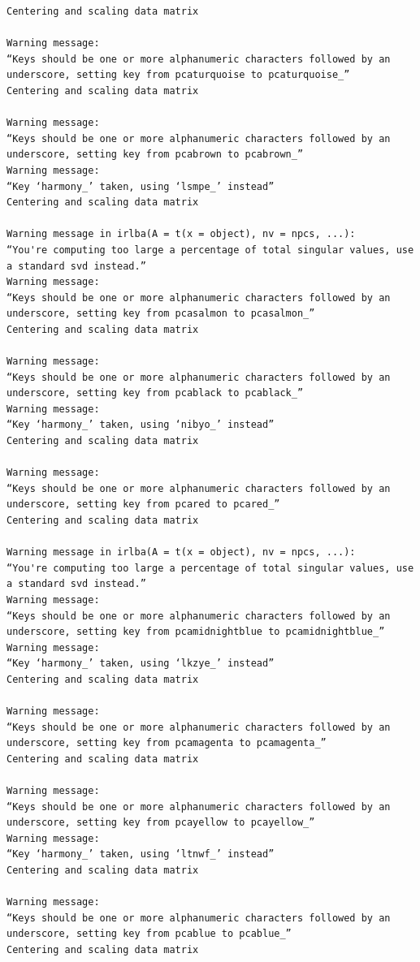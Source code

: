 \documentclass[
  letterpaper,
  DIV=11,
  numbers=noendperiod]{scrartcl}
\begin{document}
\begin{verbatim}
Centering and scaling data matrix

Warning message:
“Keys should be one or more alphanumeric characters followed by an underscore, setting key from pcaturquoise to pcaturquoise_”
Centering and scaling data matrix

Warning message:
“Keys should be one or more alphanumeric characters followed by an underscore, setting key from pcabrown to pcabrown_”
Warning message:
“Key ‘harmony_’ taken, using ‘lsmpe_’ instead”
Centering and scaling data matrix

Warning message in irlba(A = t(x = object), nv = npcs, ...):
“You're computing too large a percentage of total singular values, use a standard svd instead.”
Warning message:
“Keys should be one or more alphanumeric characters followed by an underscore, setting key from pcasalmon to pcasalmon_”
Centering and scaling data matrix

Warning message:
“Keys should be one or more alphanumeric characters followed by an underscore, setting key from pcablack to pcablack_”
Warning message:
“Key ‘harmony_’ taken, using ‘nibyo_’ instead”
Centering and scaling data matrix

Warning message:
“Keys should be one or more alphanumeric characters followed by an underscore, setting key from pcared to pcared_”
Centering and scaling data matrix

Warning message in irlba(A = t(x = object), nv = npcs, ...):
“You're computing too large a percentage of total singular values, use a standard svd instead.”
Warning message:
“Keys should be one or more alphanumeric characters followed by an underscore, setting key from pcamidnightblue to pcamidnightblue_”
Warning message:
“Key ‘harmony_’ taken, using ‘lkzye_’ instead”
Centering and scaling data matrix

Warning message:
“Keys should be one or more alphanumeric characters followed by an underscore, setting key from pcamagenta to pcamagenta_”
Centering and scaling data matrix

Warning message:
“Keys should be one or more alphanumeric characters followed by an underscore, setting key from pcayellow to pcayellow_”
Warning message:
“Key ‘harmony_’ taken, using ‘ltnwf_’ instead”
Centering and scaling data matrix

Warning message:
“Keys should be one or more alphanumeric characters followed by an underscore, setting key from pcablue to pcablue_”
Centering and scaling data matrix


\end{verbatim}
\end{document}
